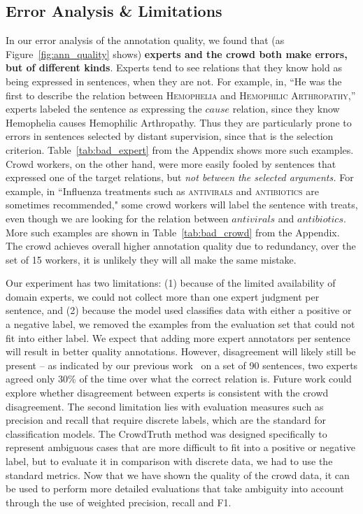 \subsection{Error Analysis \& Limitations}

In our error analysis of the annotation quality, we found that (as Figure~\ref{fig:ann_quality} shows) \textbf{experts and the crowd both make errors, but of different kinds}.  Experts tend to see relations that they know hold as being expressed in sentences, when they are not.  For example, in, ``He was the first to describe the relation between \textsc{Hemophelia} and \textsc{Hemophilic Arthropathy},'' experts labeled the sentence as expressing the $cause$ relation, since they know Hemophelia causes Hemophilic Arthropathy.  Thus they are particularly prone to errors in sentences selected by distant supervision, since that is the selection criterion. Table~\ref{tab:bad_expert} from the Appendix shows more such examples.  Crowd workers, on the other hand, were more easily fooled by sentences that expressed one of the target relations, but {\em not between the selected arguments.}  For example, in ``Influenza treatments such as \textsc{antivirals} and \textsc{antibiotics} are sometimes recommended," some crowd workers will label the sentence with treats, even though we are looking for the relation between $antivirals$ and $antibiotics$. More such examples are shown in Table~\ref{tab:bad_crowd} from the Appendix. The crowd achieves overall higher annotation quality due to redundancy, over the set of 15 workers, it is unlikely they will all make the same mistake.

Our experiment has two limitations: (1) because of the limited availability of domain experts, we could not collect more than one expert judgment per sentence, and (2) because the model used classifies data with either a positive or a negative label, we removed the examples from the evaluation set that could not fit into either label.  We expect that adding more expert annotators per sentence will result in better quality annotations. However, disagreement will likely still be present -- as indicated by our previous work~\cite{aroyo2013crowd} on a set of 90 sentences, two experts agreed only 30\% of the time over what the correct relation is. Future work could explore whether disagreement between experts is consistent with the crowd disagreement. The second limitation lies with evaluation measures such as precision and recall that require discrete labels, which are the standard for classification models. The CrowdTruth method was designed specifically to represent ambiguous cases that are more difficult to fit into a positive or negative label, but to evaluate it in comparison with discrete data, we had to use the standard metrics. Now that we have shown the quality of the crowd data, it can be used to perform more detailed evaluations that take ambiguity into account through the use of weighted precision, recall and F1.



